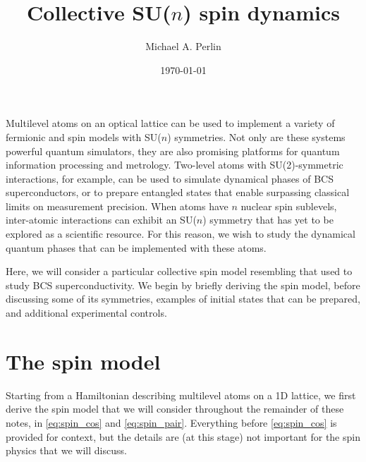\documentclass[nofootinbib,notitlepage,11pt]{revtex4-2}
\newcommand{\1}{\mathds{1}}
\begin{document}
\thispagestyle{fancy}

\title{Collective SU($n$) spin dynamics}%
\author{Michael A. Perlin}%
\date{\today}


\maketitle
\begin{singlespace}
  \tableofcontents
\end{singlespace}
\vspace{1cm}

Multilevel atoms on an optical lattice can be used to implement a variety of fermionic and spin models with SU($n$) symmetries.
Not only are these systems powerful quantum simulators, they are also promising platforms for quantum information processing and metrology.
Two-level atoms with SU(2)-symmetric interactions, for example, can be used to simulate dynamical phases of BCS superconductors, or to prepare entangled states that enable surpassing classical limits on measurement precision.
When atoms have $n$ nuclear spin sublevels, inter-atomic interactions can exhibit an SU($n$) symmetry that has yet to be explored as a scientific resource.
For this reason, we wish to study the dynamical quantum phases that can be implemented with these atoms.

Here, we will consider a particular collective spin model resembling that used to study BCS superconductivity.
We begin by briefly deriving the spin model, before discussing some of its symmetries, examples of initial states that can be prepared, and additional experimental controls.

\section{The spin model}

Starting from a Hamiltonian describing multilevel atoms on a 1D lattice, we first derive the spin model that we will consider throughout the remainder of these notes, in \eqref{eq:spin_cos} and \eqref{eq:spin_pair}.
Everything before \eqref{eq:spin_cos} is provided for context, but the details are (at this stage) not important for the spin physics that we will discuss.
\end{document}

